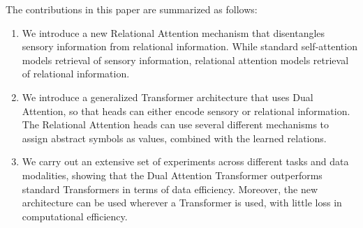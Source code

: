 The contributions in this paper are summarized as follows:
\begin{enumerate}
  \item We introduce a new Relational Attention mechanism that disentangles sensory information from relational information. While standard self-attention models retrieval of sensory information, relational attention models retrieval of relational information.
  \item We introduce a generalized Transformer architecture that uses Dual Attention, so that heads can either encode sensory or relational information. The Relational Attention heads can use several different mechanisms to assign abstract symbols as values, combined with the learned relations.
  \item We carry out an extensive set of experiments across different tasks and data modalities, showing that the Dual Attention Transformer outperforms standard Transformers in terms of data efficiency. Moreover, the new architecture can be used wherever a Transformer is used, with little loss in computational efficiency. 
\end{enumerate}


